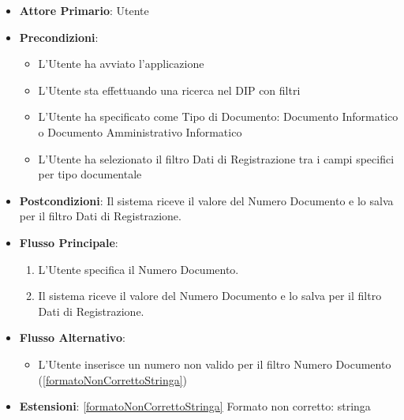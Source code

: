 \begin{itemize}
      \item \textbf{Attore Primario}: Utente
      \item \textbf{Precondizioni}: 
      \begin{itemize}            
            \item L'Utente ha avviato l'applicazione
            \item L'Utente sta effettuando una ricerca nel DIP con filtri
            \item L'Utente ha specificato come Tipo di Documento: Documento Informatico o Documento Amministrativo Informatico
            \item L'Utente ha selezionato il filtro Dati di Registrazione tra i campi specifici per tipo documentale
      \end{itemize}
      \item \textbf{Postcondizioni}: Il sistema riceve il valore del Numero Documento e lo salva per il filtro Dati di Registrazione.
      \item \textbf{Flusso Principale}:
      \begin{enumerate}
            \item L'Utente specifica il Numero Documento.
            \item Il sistema riceve il valore del Numero Documento e lo salva per il filtro Dati di Registrazione.
      \end{enumerate}
      \item \textbf{Flusso Alternativo}:
      \begin{itemize}
            \item L'Utente inserisce un numero non valido per il filtro Numero Documento (\ref{formatoNonCorrettoStringa})
      \end{itemize}
      \item \textbf{Estensioni}: \ref{formatoNonCorrettoStringa} Formato non corretto: stringa
\end{itemize}

